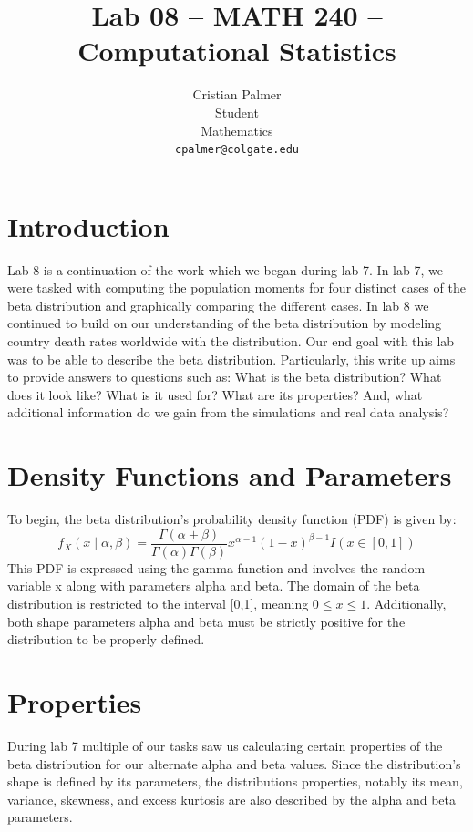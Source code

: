 \documentclass{article}\usepackage[]{graphicx}\usepackage[]{xcolor}
\begin{document}
\vspace{-1in}
\title{Lab 08 -- MATH 240 -- Computational Statistics}

\author{
  Cristian Palmer \\
  Student  \\
  Mathematics  \\
  {\tt cpalmer@colgate.edu}
}

\date{}

\maketitle

\begin{multicols}{2}

\section{Introduction}
Lab 8 is a continuation of the work which we began during lab 7. In lab 7, we were tasked with computing the population moments for four distinct cases of the beta distribution and graphically comparing the different cases. In lab 8 we continued to build on our understanding of the beta distribution by modeling country death rates worldwide with the distribution. Our end goal with this lab was to be able to describe the beta distribution. Particularly, this write up aims to provide answers to questions such as: What is the beta distribution? What does it look like? What is it used for? What are its properties? And, what additional information do we gain from the simulations and real data analysis?  


\section{Density Functions and Parameters}
To begin, the beta distribution's probability density function (PDF) is given by: 
\[
f_X(x \mid \alpha, \beta) = \frac{\Gamma(\alpha+\beta)}{\Gamma(\alpha) \Gamma(\beta)} x^{\alpha-1} (1-x)^{\beta-1} I(x \in [0,1])
\]
This PDF is expressed using the gamma function and involves the random variable x along with parameters alpha and beta. The domain of the beta distribution is restricted to the interval [0,1], meaning $0 \leq x \leq 1$. Additionally, both shape parameters alpha and beta must be strictly positive for the distribution to be properly defined. 

\section{Properties}
During lab 7 multiple of our tasks saw us calculating certain properties of the beta distribution for our alternate alpha and beta values. Since the distribution’s shape is defined by its parameters, the distributions properties, notably its mean, variance, skewness, and excess kurtosis are also described by the alpha and beta parameters. 



\end{multicols}
\end{document}
